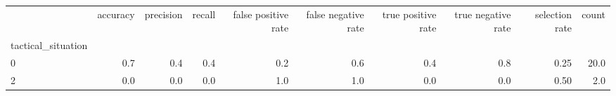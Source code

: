 \begin{tabular}{lrrrrrrrrr}
\toprule
{} &  accuracy &  precision &  recall &  false positive rate &  false negative rate &  true positive rate &  true negative rate &  selection rate &  count \\
tactical\_situation &           &            &         &                      &                      &                     &                     &                 &        \\
\midrule
0                  &       0.7 &        0.4 &     0.4 &                  0.2 &                  0.6 &                 0.4 &                 0.8 &            0.25 &   20.0 \\
2                  &       0.0 &        0.0 &     0.0 &                  1.0 &                  1.0 &                 0.0 &                 0.0 &            0.50 &    2.0 \\
\bottomrule
\end{tabular}

